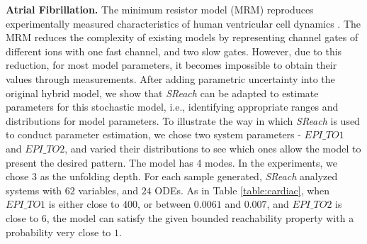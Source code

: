 \vspace{-.1cm}
{\bf\noindent Atrial Fibrillation.} The minimum resistor model (MRM) reproduces experimentally measured characteristics of human ventricular cell dynamics \cite{bueno2008minimal}. The MRM reduces the complexity of existing models by representing channel gates of different ions with one fast channel, and two slow gates. However, due to this reduction, for most model parameters, it becomes impossible to obtain their values through measurements. After adding parametric uncertainty into the original hybrid model, we show that {\it SReach} can be adapted to estimate parameters for this stochastic model, i.e., identifying appropriate ranges and distributions for model parameters. To illustrate the way in which {\it SReach} is used to conduct parameter estimation, we chose two system parameters - $E\!P\!I\_\!T\!O1$ and $E\!P\!I\_\!T\!O2$, and varied their distributions to see which ones allow the model to present the desired pattern. The model has 4 modes. In the experiments, we chose $3$ as the unfolding depth. For each sample generated, {\it SReach} analyzed systems with $62$ variables, and $24$ ODEs. As in Table \ref{table:cardiac}, when $E\!P\!I\_\!T\!O1$ is either close to $400$, or between $0.0061$ and $0.007$, and $E\!P\!I\_\!T\!O2$ is close to $6$, the model can satisfy the given bounded reachability property with a probability very close to $1$. 
\vspace{-.2cm}
